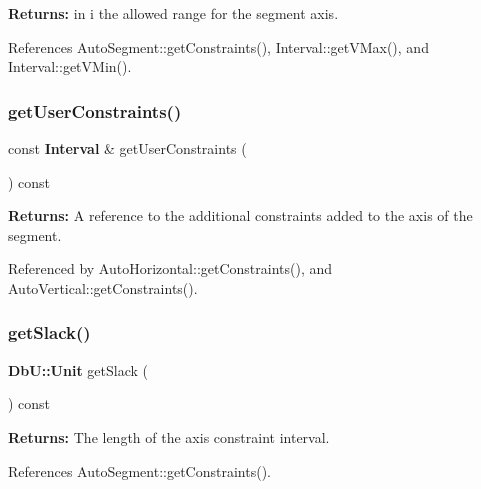 {\bfseries Returns\+:} in {\ttfamily i} the allowed range for the segment axis. 

References Auto\+Segment\+::get\+Constraints(), Interval\+::get\+V\+Max(), and Interval\+::get\+V\+Min().

\mbox{\label{classKatabatic_1_1AutoSegment_aa7cf8d4df6a5d945dd180d45e8bbcedf}} 
\subsubsection{\texorpdfstring{get\+User\+Constraints()}{getUserConstraints()}}
{\footnotesize\ttfamily const \textbf{ Interval} \& get\+User\+Constraints (\begin{DoxyParamCaption}{ }\end{DoxyParamCaption}) const\hspace{0.3cm}{\ttfamily [inline]}}

{\bfseries Returns\+:} A reference to the additional constraints added to the axis of the segment. 

Referenced by Auto\+Horizontal\+::get\+Constraints(), and Auto\+Vertical\+::get\+Constraints().

\mbox{\label{classKatabatic_1_1AutoSegment_a8789ebe71b2ff3d0265f5319a3be5afb}} 
\subsubsection{\texorpdfstring{get\+Slack()}{getSlack()}}
{\footnotesize\ttfamily \textbf{ Db\+U\+::\+Unit} get\+Slack (\begin{DoxyParamCaption}{ }\end{DoxyParamCaption}) const\hspace{0.3cm}{\ttfamily [virtual]}}

{\bfseries Returns\+:} The length of the axis constraint interval. 

References Auto\+Segment\+::get\+Constraints().

\mbox{\label{classKatabatic_1_1AutoSegment_a9405b4f5345d116f71c40ba2c16097d0}} 
